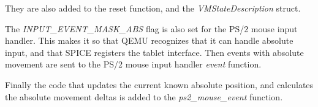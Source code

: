 %

\begin{codeblock}
    
\end{codeblock}

They are also added to the reset function, and the \emph{VMStateDescription}
struct.

\begin{codeblock}
    
\end{codeblock}

The \emph{INPUT\_EVENT\_MASK\_ABS} flag is also set for the PS/2 mouse input
handler.  This makes it so that QEMU recognizes that it can handle absolute
input, and that SPICE registers the tablet interface.  Then events with absolute
movement are sent to the PS/2 mouse input handler \emph{event} function.

\begin{codeblock}
    
\end{codeblock}

Finally the code that updates the current known absolute position, and
calculates the absolute movement deltas is added to the \emph{ps2\_mouse\_event}
function.

\begin{codeblock}
    
\end{codeblock}





